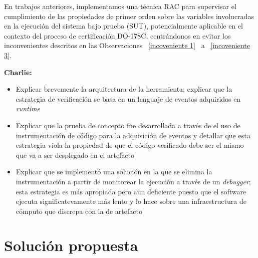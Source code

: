 En trabajos anteriores, implementamos una técnica RAC para supervisar el cumplimiento de las propiedades de primer orden sobre las variables involucradas en la ejecución del sistema bajo prueba (SUT), potencialmente aplicable en el contexto del proceso de certificación DO-178C, centrándonos en evitar los inconvenientes descritos en las Observaciones ~\ref{incoveniente 1}~ a ~\ref{incoveniente 3}.




{\Large \bf Charlie:}
\begin{itemize}
\item Explicar brevemente la arquitectura de la herramienta; explicar que la estrategia de verificación se basa en un lenguaje de eventos adquiridos en \textit{runtime}
\item Explicar que la prueba de concepto fue desarrollada a través de el uso de instrumentación de código para la adquisición de eventos y detallar que esta estrategia viola la propiedad de que el código verificado debe ser el mismo que va a ser desplegado en el artefacto
\item Explicar que se implementó una solución en la que se elimina la instrumentación a partir de monitorear la ejecución a través de un \textit{debugger}; esta estrategia es más apropiada pero aun deficiente puesto que el software ejecuta significatevamente más lento y lo hace sobre una infraestructura de cómputo que discrepa con la de artefacto
\end{itemize}


\section{Solución propuesta}

